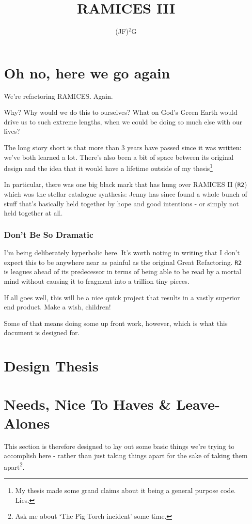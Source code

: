 \documentclass[a4paper,10pt]{article}
\title{RAMICES III}
\author{(JF)$^2$G}
\begin{document}
\maketitle
	\def\RTwo{\texttt{R2}}
	\newpage
	

		\section*{Oh no, here we go again}

			We're refactoring RAMICES. Again.

			Why? Why would we do this to ourselves? What on God's Green Earth would drive us to such extreme lengths, when we could be doing so much else with our lives?
			
			The long story short is that more than 3 years have passed since it was written: we've both learned a lot. There's also been a bit of space between its original design and the idea that it would have a lifetime outside of my thesis\footnote{My thesis made some grand claims about it being a general purpose code. Lies.}

			In particular, there was one big black mark that has hung over RAMICES II (\RTwo) which was the stellar catalogue synthesis: Jenny has since found a whole bunch of stuff that's basically held together by hope and good intentions - or simply not held together at all. 

			\subsubsection*{Don't Be So Dramatic}

				I'm being deliberately hyperbolic here. It's worth noting in writing that I don't expect this to be anywhere near as painful as the original Great Refactoring. \RTwo{} is leagues ahead of its predecessor in terms of being able to be read by a mortal mind without causing it to fragment into a trillion tiny pieces. 

				If all goes well, this will be a nice quick project that results in a vastly superior end product. Make a wish, children!

				Some of that means doing some up front work, however, which is what this document is designed for.


		\section{Design Thesis}
		\section*{Needs, Nice To Haves \& Leave-Alones}
			This section is therefore designed to lay out some basic things we're trying to accomplish
			here - rather than just taking things apart for the sake of taking them apart\footnote{Ask me about `The Pig Torch incident' some time.}.
		
\end{document}
